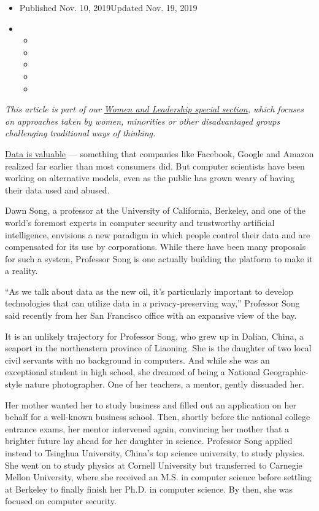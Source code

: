 \begin{itemize}
\item
  Published Nov. 10, 2019Updated Nov. 19, 2019
\item
  \begin{itemize}
  \item
  \item
  \item
  \item
  \item
  \end{itemize}
\end{itemize}

\emph{This article is part of our}
\href{https://www.nytimes3xbfgragh.onion/spotlight/women-and-leadership}{\emph{Women
and Leadership special section}}\emph{, which focuses on approaches
taken by women, minorities or other disadvantaged groups challenging
traditional ways of thinking.}

\href{https://www.nytimes3xbfgragh.onion/interactive/2019/09/23/opinion/data-privacy-jaron-lanier.html}{Data
is valuable} --- something that companies like Facebook, Google and
Amazon realized far earlier than most consumers did. But computer
scientists have been working on alternative models, even as the public
has grown weary of having their data used and abused.

Dawn Song, a professor at the University of California, Berkeley, and
one of the world's foremost experts in computer security and trustworthy
artificial intelligence, envisions a new paradigm in which people
control their data and are compensated for its use by corporations.
While there have been many proposals for such a system, Professor Song
is one actually building the platform to make it a reality.

``As we talk about data as the new oil, it's particularly important to
develop technologies that can utilize data in a privacy-preserving
way,'' Professor Song said recently from her San Francisco office with
an expansive view of the bay.

It is an unlikely trajectory for Professor Song, who grew up in Dalian,
China, a seaport in the northeastern province of Liaoning. She is the
daughter of two local civil servants with no background in computers.
And while she was an exceptional student in high school, she dreamed of
being a National Geographic-style nature photographer. One of her
teachers, a mentor, gently dissuaded her.

Her mother wanted her to study business and filled out an application on
her behalf for a well-known business school. Then, shortly before the
national college entrance exams, her mentor intervened again, convincing
her mother that a brighter future lay ahead for her daughter in science.
Professor Song applied instead to Tsinghua University, China's top
science university, to study physics. She went on to study physics at
Cornell University but transferred to Carnegie Mellon University, where
she received an M.S. in computer science before settling at Berkeley to
finally finish her Ph.D. in computer science. By then, she was focused
on computer security.

